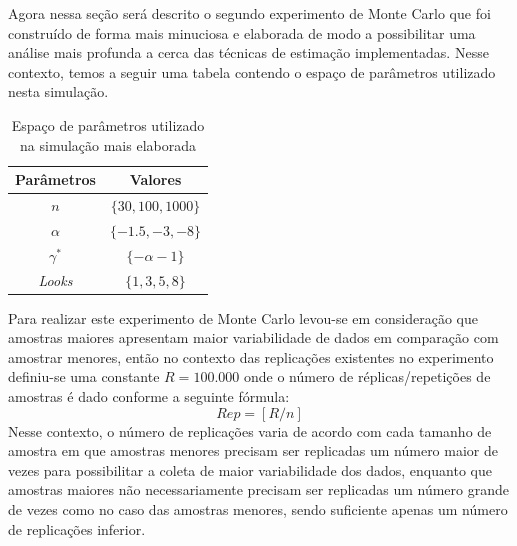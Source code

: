 Agora nessa seção será descrito o segundo experimento de Monte Carlo que foi construído de forma mais minuciosa e elaborada de modo a possibilitar uma análise mais profunda a cerca das técnicas de estimação implementadas. Nesse contexto, temos a seguir uma tabela contendo o espaço de parâmetros utilizado nesta simulação.
\begin{table}[H]
\centering
\caption{Espaço de parâmetros utilizado na simulação mais elaborada}
\smallskip
{}
\label{tab:tabela_parameters_2}
\begin{tabular}{c|c}
\toprule 
\multicolumn{1}{c|}{Parâmetros} & \multicolumn{1}{c}{Valores}  \\ 
\midrule
\rowcolor[gray]{.9} 
$n$ & $\{30, 100, 1000\}$ \\ \hline
$\alpha$ & $\{-1.5, -3, -8\}$ \\ \hline
\rowcolor[gray]{.9} $\gamma^*$ & $\{-\alpha - 1\}$ \\ \hline
\textit{Looks} & $\{1, 3, 5, 8\}$ \\ 
\bottomrule
\end{tabular}
\end{table}

Para realizar este experimento de Monte Carlo levou-se em consideração que amostras maiores apresentam maior variabilidade de dados em comparação com amostrar menores, então no contexto das replicações existentes no experimento definiu-se uma constante $R = 100.000$ onde o número de réplicas/repetições de amostras é dado conforme a seguinte fórmula:
\begin{equation}
    Rep = [R/n] \label{eq:rep}
\end{equation}
Nesse contexto, o número de replicações varia de acordo com cada tamanho de amostra em que amostras menores precisam ser replicadas um número maior de vezes para possibilitar a coleta de maior variabilidade dos dados, enquanto que amostras maiores não necessariamente precisam ser replicadas um número grande de vezes como no caso das amostras menores, sendo suficiente apenas um número de replicações inferior. 

